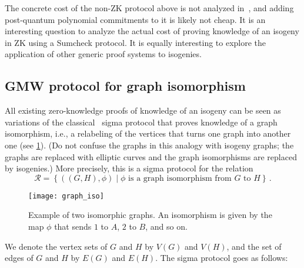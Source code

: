 \documentclass{llncs}
\newcommand{\Rela}{\mathcal{R}}
\begin{document}
The concrete cost of the non-ZK protocol above is not analyzed in~\cite{10.1007/978-3-030-99277-4_21}, and adding post-quantum polynomial commitments to it is likely not cheap.
It is an interesting question to analyze the actual cost of proving knowledge of an isogeny in ZK using a Sumcheck protocol.
It is equally interesting to explore the application of other generic proof systems to isogenies.


\subsection{GMW protocol for graph isomorphism \label{sec:GMW}}

All existing zero-knowledge proofs of knowledge of an isogeny can be seen as variations of the classical~\cite{GMW} sigma protocol that proves knowledge of a graph isomorphism, i.e., a relabeling of the vertices that turns one graph into another one (see \cref{fig:graph_iso}). 
(Do not confuse the graphs in this analogy with isogeny graphs; the graphs are replaced with elliptic curves and the graph isomorphisms are replaced by isogenies.)
More precisely, this is a sigma protocol for the relation \[
\Rela = \left \{ ((G,H),\phi) \mid \phi \text{ is a graph isomorphism from $G$ to $H$} \right \} \,.
\]




\begin{figure} \label{fig:graph_iso}
\centering
\texttt{[image: graph\_iso]}
\caption[Example of a graph isomorphism]{Example of two isomorphic graphs. An isomorphism is given by the map $\phi$ that sends $1$ to $A$, $2$ to $B$, and so on. } 
\end{figure}



We denote the vertex sets of $G$ and $H$ by $V(G)$ and $V(H)$, and the set of edges of $G$ and $H$ by $E(G)$ and $E(H)$. The sigma protocol goes as follows:
\end{document}
